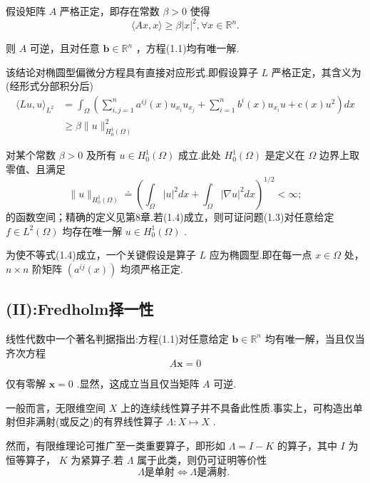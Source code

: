 假设矩阵 $A$ 严格正定，即存在常数 $\beta  > 0$ 使得
\[
\langle {Ax},x\rangle  \geq  \beta {\left| x\right| }^{2},\forall x \in  {\mathbb{R}}^{n}.
\]

则 $A$ 可逆，且对任意 $\bm{b} \in  {\mathbb{R}}^{n}$ ，方程(1.1)均有唯一解.

该结论对椭圆型偏微分方程具有直接对应形式.即假设算子 $L$ 严格正定，其含义为(经形式分部积分后)
\begin{equation}\tag{1.4}
\begin{aligned}
\langle {Lu},u{\rangle }_{L^2} &= {\int }_{\Omega }\left( {\mathop{\sum }\limits_{{i,j = 1}}^{n}{a}^{ij}\left( x\right) {u}_{{x}_{i}}{u}_{{x}_{j}} + \mathop{\sum }\limits_{{i = 1}}^{n}{b}^{i}\left( x\right) {u}_{{x}_{i}}u + \mathrm{c}\left( x\right) {u}^{2}}\right) {dx} \\
&\geq  \beta \| u{\| }_{{H}_{0}^{1}\left( \Omega \right) }^{2}
\end{aligned}
\end{equation}

对某个常数 $\beta  > 0$ 及所有 $u \in  {H}_{0}^{1}\left( \Omega \right)$ 成立.此处 ${H}_{0}^{1}\left( \Omega \right)$ 是定义在 $\Omega$ 边界上取零值、且满足
\[
\| u{\| }_{{H}_{0}^{1}\left( \Omega \right) } \doteq  {\left( {\int }_{\Omega }{\left| u\right| }^{2}dx + {\int }_{\Omega }{\left| \nabla u\right| }^{2}dx\right) }^{1/2} < \infty ;
\]
的函数空间；精确的定义见第8章.若(1.4)成立，则可证问题(1.3)对任意给定 $f \in  L^2\left( \Omega \right)$ 均存在唯一解 $u \in  {H}_{0}^{1}\left( \Omega \right)$ .

为使不等式(1.4)成立，一个关键假设是算子 $L$ 应为椭圆型.即在每一点 $x \in  \Omega$ 处， $n \times  n$ 阶矩阵 $\left( {{a}^{ij}\left( x\right) }\right)$ 均须严格正定.

\subsection*{(II):Fredholm择一性}\par

线性代数中一个著名判据指出:方程(1.1)对任意给定 $\bm{b} \in  {\mathbb{R}}^{n}$ 均有唯一解，当且仅当齐次方程
\[
A\bm{x} = 0
\]

仅有零解 $\bm{x} = 0$ .显然，这成立当且仅当矩阵 $A$ 可逆.

一般而言，无限维空间 $X$ 上的连续线性算子并不具备此性质.事实上，可构造出单射但非满射(或反之)的有界线性算子 $\Lambda  : X \mapsto  X$ .

然而，有限维理论可推广至一类重要算子，即形如 $\Lambda  = I - K$ 的算子，其中 $I$ 为恒等算子， $K$ 为紧算子.若 $\Lambda$ 属于此类，则仍可证明等价性
\[
\Lambda \text{是单射} \Leftrightarrow  \Lambda \text{是满射. }
\]

